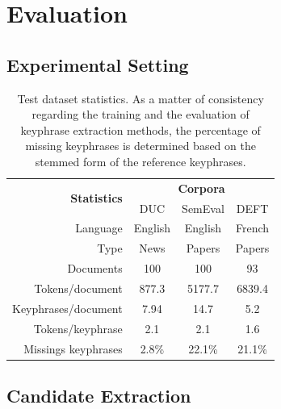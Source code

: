 \section{Evaluation}
\label{sec:evaluation}

  \subsection{Experimental Setting}
  \label{subsec:experimental_setting}
    \begin{table}
      \centering
      \begin{tabular}{rccc}
        \toprule
        \multirow{2}{*}[-2pt]{\textbf{Statistics}} & \multicolumn{3}{c}{\textbf{Corpora}}\\
        \cmidrule{2-4}
        & DUC & SemEval & DEFT\\
        \midrule
        Language & English & English & French\\
        Type & News & Papers & Papers\\
        Documents & 100 & 100 & 93\\
        Tokens/document & 877.3 & 5177.7 & 6839.4\\
        Keyphrases/document & 7.94 & 14.7 & 5.2\\
        Tokens/keyphrase & 2.1 & 2.1 & 1.6\\
        Missings keyphrases & 2.8\% & 22.1\% & 21.1\% \\
        \bottomrule
      \end{tabular}
      \caption{Test dataset statistics. As a matter of consistency regarding
               the training and the evaluation of keyphrase extraction methods,
               the percentage of missing keyphrases is determined based on the
               stemmed form of the reference keyphrases.
               \label{tab:test_dataset_statistics}}
    \end{table}

  \subsection{Candidate Extraction}
  \label{subsec:candidate_extraction}

